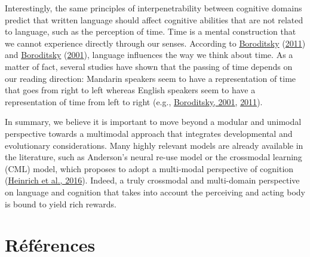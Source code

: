 \documentclass[
  a4paper,12pt,twoside,onecolumn,openright,final,oldfontcommands]{memoir}
\newcommand\chaptercolor{gray}
\newcommand{\changechaptercolor}[1]{
  \renewcommand\chaptercolor{#1}
}
\begin{document}
Interestingly, the same principles of interpenetrability between cognitive domains predict that written language should affect cognitive abilities that are not related to language, such as the perception of time. Time is a mental construction that we cannot experience directly through our senses. According to \protect\hyperlink{ref-boroditsky_how_2011-1}{Boroditsky} (\protect\hyperlink{ref-boroditsky_how_2011-1}{2011}) and \protect\hyperlink{ref-boroditsky_does_2001}{Boroditsky} (\protect\hyperlink{ref-boroditsky_does_2001}{2001}), language influences the way we think about time. As a matter of fact, several studies have shown that the passing of time depends on our reading direction: Mandarin speakers seem to have a representation of time that goes from right to left whereas English speakers seem to have a representation of time from left to right (e.g., \protect\hyperlink{ref-boroditsky_does_2001}{Boroditsky, 2001}, \protect\hyperlink{ref-boroditsky_how_2011-1}{2011}).

In summary, we believe it is important to move beyond a modular and unimodal perspective towards a multimodal approach that integrates developmental and evolutionary considerations. Many highly relevant models are already available in the literature, such as Anderson's neural re-use model or the crossmodal learning (CML) model, which proposes to adopt a multi-modal perspective of cognition (\protect\hyperlink{ref-heinrich_crossmodal_2016}{Heinrich et al., 2016}). Indeed, a truly crossmodal and multi-domain perspective on language and cognition that takes into account the perceiving and acting body is bound to yield rich rewards.

\changechaptercolor{gray}

\hypertarget{ruxe9fuxe9rences}{%
\chapter*{Références}\label{ruxe9fuxe9rences}}

\end{document}
